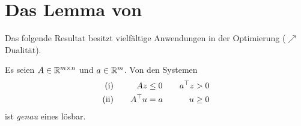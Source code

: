 \section{Das Lemma von }

Das folgende Resultat besitzt vielfältige Anwendungen in der Optimierung ($\nearrow$ Dualität).

\begin{lemma}[Farkas] %
	Es seien $A \in \mathbb{R}^{m \times n}$ und $a \in \mathbb{R}^m$.  Von den Systemen
	\begin{equation*}
		\begin{alignedat}{4}
		\text{(i)} & \qquad & Az &\le 0 & \quad  a^{\top} z &> 0 \\
		\text{(ii)}& \qquad  & A^{\top} u &= a  \quad & u &\ge 0
		\end{alignedat}
	\end{equation*}
	ist \textit{genau} eines lösbar.
\end{lemma}

